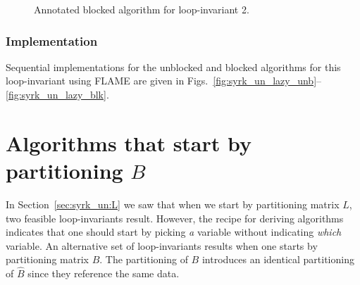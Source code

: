 \renewcommand{\beforeupdate}{
\FlaTwoByOne{ 
\FlaTwoByOneSingleLine{ B_0 }{ B_1 }
}
{
B_2
} =
\FlaTwoByOne{ 
\FlaTwoByOneSingleLine{ \hat{B}_0 }{ \hat{B}_1 }
}
{
\FlaOneByTwoSingleLine{L_{20}}{L_{21}}
\FlaTwoByOneSingleLine{\hat{B}_0}{ \hat{B}_1 } +
L_{22} \hat{B}_2
}
\wedge \ldots
}

\renewcommand{\afterupdate}{
\FlaTwoByOne{ 
B_0
}
{
\FlaTwoByOneSingleLine{ B_1 }{ B_2 }
} =
\FlaTwoByOne{ 
\hat{B}_0
}
{
\FlaTwoByOneSingleLine{ L_{10} }{ L_{20} }
\hat{B}_0 +
\FlaTwoByTwoSingleLine{ L_{11} }{ L_{12} }
                      { L_{21} }{ L_{22} }
\FlaTwoByOneSingleLine{ \hat{B}_1 }{ \hat{B}_2 }
}
\wedge \ldots
}

\renewcommand{\update}{
\begin{minipage}[t]{4in}
\noindent
$ B_1 \becomes L_{10} B_0 + L_{11} B_1 $\\
\end{minipage}
}

\begin{figure}[htbp]
\worksheet
\caption{Annotated blocked algorithm for loop-invariant 2.}
\label{fig:ws:ltrmm_lln:var2:blk}
\end{figure}
%

\subsubsection{Implementation}

Sequential implementations for the unblocked and blocked algorithms
for this loop-invariant using FLAME are given in
Figs.~\ref{fig:syrk_un_lazy_unb}--\ref{fig:syrk_un_lazy_blk}.

\section{Algorithms that start by partitioning $ B $}

In Section~\ref{sec:syrk_un:L} we saw that when we start by
partitioning matrix $ L $, two feasible loop-invariants result.
However, the recipe for deriving algorithms indicates that one should
start by picking {\em a} variable without indicating {\em which}
variable.  An alternative set of loop-invariants results when one
starts by partitioning matrix $ B $.  The partitioning of $ B $
introduces an identical partitioning of $ \hat{B} $ since they
reference the same data.

